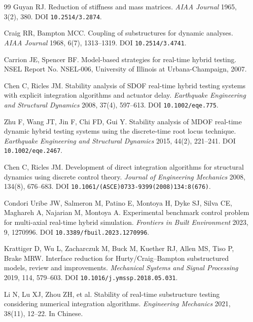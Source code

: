 \documentclass[11pt]{article}
\begin{document}
\begin{thebibliography}{99}
Guyan RJ. Reduction of stiffness and mass matrices. \textit{AIAA Journal} 1965, 3(2), 380. DOI \nolinkurl{10.2514/3.2874}.

Craig RR, Bampton MCC. Coupling of substructures for dynamic analyses. \textit{AIAA Journal} 1968, 6(7), 1313--1319. DOI \nolinkurl{10.2514/3.4741}.

Carrion JE, Spencer BF. Model-based strategies for real-time hybrid testing. NSEL Report No. NSEL-006, University of Illinois at Urbana-Champaign, 2007.

Chen C, Ricles JM. Stability analysis of SDOF real-time hybrid testing systems with explicit integration algorithms and actuator delay. \textit{Earthquake Engineering and Structural Dynamics} 2008, 37(4), 597--613. DOI \nolinkurl{10.1002/eqe.775}.

Zhu F, Wang JT, Jin F, Chi FD, Gui Y. Stability analysis of MDOF real-time dynamic hybrid testing systems using the discrete-time root locus technique. \textit{Earthquake Engineering and Structural Dynamics} 2015, 44(2), 221--241. DOI \nolinkurl{10.1002/eqe.2467}.

Chen C, Ricles JM. Development of direct integration algorithms for structural dynamics using discrete control theory. \textit{Journal of Engineering Mechanics} 2008, 134(8), 676--683. DOI \nolinkurl{10.1061/(ASCE)0733-9399(2008)134:8(676)}.

Condori Uribe JW, Salmeron M, Patino E, Montoya H, Dyke SJ, Silva CE, Maghareh A, Najarian M, Montoya A. Experimental benchmark control problem for multi-axial real-time hybrid simulation. \textit{Frontiers in Built Environment} 2023, 9, 1270996. DOI \nolinkurl{10.3389/fbuil.2023.1270996}.

Krattiger D, Wu L, Zacharczuk M, Buck M, Kuether RJ, Allen MS, Tiso P, Brake MRW. Interface reduction for Hurty/Craig--Bampton substructured models, review and improvements. \textit{Mechanical Systems and Signal Processing} 2019, 114, 579--603. DOI \nolinkurl{10.1016/j.ymssp.2018.05.031}.

Li N, Lu XJ, Zhou ZH, et al. Stability of real-time substructure testing considering numerical integration algorithms. \textit{Engineering Mechanics} 2021, 38(11), 12--22. In Chinese.
\end{thebibliography}
\end{document}
